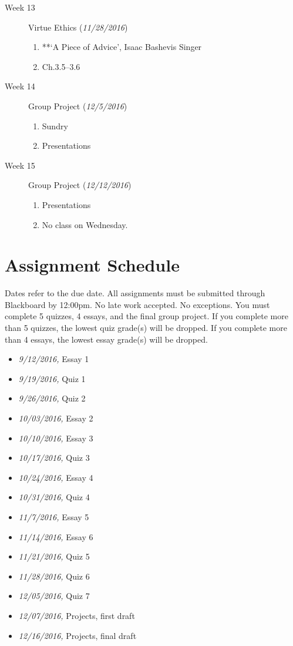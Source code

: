 \documentclass[article,oneside]{memoir}
\begin{document}
\begin{description}
\begin{enumerate}
\end{enumerate}

\item[Week 13]  Virtue Ethics (\emph{11/28/2016})
\begin{enumerate}
\item **`A Piece of Advice', Isaac Bashevis Singer
\item Ch.3.5--3.6
\end{enumerate}

\item[Week 14] Group Project (\emph{12/5/2016})
\begin{enumerate}
\item Sundry
\item Presentations 
\end{enumerate}

\item[Week 15] Group Project (\emph{12/12/2016})
\begin{enumerate}
\item Presentations 
\item No class on Wednesday.
\end{enumerate}
\end{description}





\section{ Assignment Schedule}
Dates refer to the due date. All assignments must be submitted through Blackboard by 12:00pm. No late work accepted. No exceptions. You must complete 5 quizzes, 4 essays, and the final group project.  If you complete more than 5 quizzes, the lowest quiz grade(s) will be dropped. If you complete more than 4 essays, the lowest essay grade(s) will be dropped. 



\begin{itemize}
\item \textit{9/12/2016,} Essay 1
\item \textit{9/19/2016,} Quiz 1
\item \textit{9/26/2016,} Quiz 2
\item \textit{10/03/2016,} Essay 2
\item \textit{10/10/2016,} Essay  3
\item \textit{10/17/2016,} Quiz 3
\item \textit{10/24/2016,}  Essay 4
\item \textit{10/31/2016,} Quiz 4
\item \textit{11/7/2016,}  Essay 5
\item \textit{11/14/2016,} Essay 6
\item \textit{11/21/2016,} Quiz 5
\item \textit{11/28/2016,} Quiz 6
\item \textit{12/05/2016,} Quiz 7
\item \textit{12/07/2016,} Projects, first draft
\item \textit{12/16/2016,} Projects, final draft 
\end{itemize}




\end{document}
